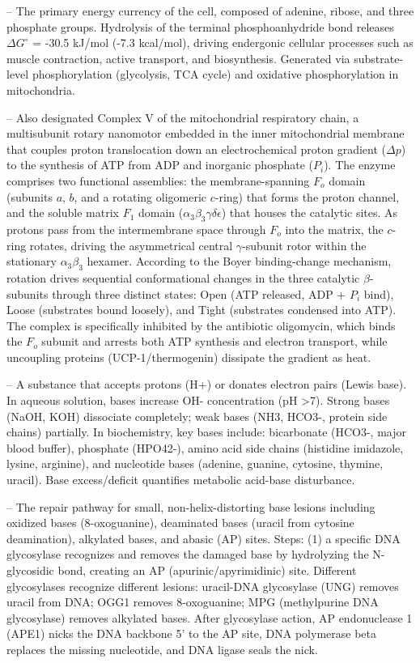 -- The primary energy currency of the cell, composed of adenine, ribose, and three phosphate groups. Hydrolysis of the terminal phosphoanhydride bond releases $\Delta G^\circ$ = -30.5 kJ/mol (-7.3 kcal/mol), driving endergonic cellular processes such as muscle contraction, active transport, and biosynthesis. Generated via substrate-level phosphorylation (glycolysis, TCA cycle) and oxidative phosphorylation in mitochondria.

-- Also designated Complex V of the mitochondrial respiratory chain, a multisubunit rotary nanomotor embedded in the inner mitochondrial membrane that couples proton translocation down an electrochemical proton gradient ($\Delta p$) to the synthesis of ATP from ADP and inorganic phosphate ($P_i$). The enzyme comprises two functional assemblies: the membrane-spanning $F_o$ domain (subunits $a$, $b$, and a rotating oligomeric $c$-ring) that forms the proton channel, and the soluble matrix $F_1$ domain ($\alpha_3\beta_3\gamma\delta\epsilon$) that houses the catalytic sites. As protons pass from the intermembrane space through $F_o$ into the matrix, the $c$-ring rotates, driving the asymmetrical central $\gamma$-subunit rotor within the stationary $\alpha_3\beta_3$ hexamer. According to the Boyer binding-change mechanism, rotation drives sequential conformational changes in the three catalytic $\beta$-subunits through three distinct states: Open (ATP released, ADP + $P_i$ bind), Loose (substrates bound loosely), and Tight (substrates condensed into ATP). The complex is specifically inhibited by the antibiotic oligomycin, which binds the $F_o$ subunit and arrests both ATP synthesis and electron transport, while uncoupling proteins (UCP-1/thermogenin) dissipate the gradient as heat.

-- A substance that accepts protons (H+) or donates electron pairs (Lewis base). In aqueous solution, bases increase OH- concentration (pH >7). Strong bases (NaOH, KOH) dissociate completely; weak bases (NH3, HCO3-, protein side chains) partially. In biochemistry, key bases include: bicarbonate (HCO3-, major blood buffer), phosphate (HPO42-), amino acid side chains (histidine imidazole, lysine, arginine), and nucleotide bases (adenine, guanine, cytosine, thymine, uracil). Base excess/deficit quantifies metabolic acid-base disturbance.

-- The repair pathway for small, non-helix-distorting base lesions including oxidized bases (8-oxoguanine), deaminated bases (uracil from cytosine deamination), alkylated bases, and abasic (AP) sites. Steps: (1) a specific DNA glycosylase recognizes and removes the damaged base by hydrolyzing the N-glycosidic bond, creating an AP (apurinic/apyrimidinic) site. Different glycosylases recognize different lesions: uracil-DNA glycosylase (UNG) removes uracil from DNA; OGG1 removes 8-oxoguanine; MPG (methylpurine DNA glycosylase) removes alkylated bases. After glycosylase action, AP endonuclease 1 (APE1) nicks the DNA backbone 5' to the AP site, DNA polymerase beta replaces the missing nucleotide, and DNA ligase seals the nick.

